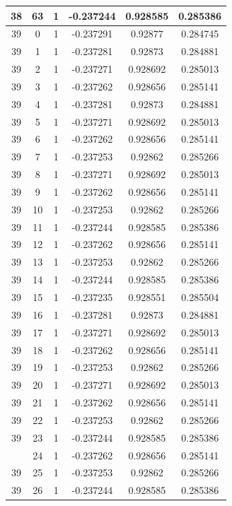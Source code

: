 \documentclass[12pt,a4paper]{article}
\numberwithin{equation}{section}
\numberwithin{figure}{section}
\numberwithin{table}{section}
\begin{document}
\begin{longtable}{|c|c|c|c|c|c|}
38 & 63 & 1 & -0.237244 & 0.928585 & 0.285386 \\ \hline
39 & 0 & 1 & -0.237291 & 0.92877 & 0.284745 \\ \hline
39 & 1 & 1 & -0.237281 & 0.92873 & 0.284881 \\ \hline
39 & 2 & 1 & -0.237271 & 0.928692 & 0.285013 \\ \hline
39 & 3 & 1 & -0.237262 & 0.928656 & 0.285141 \\ \hline
39 & 4 & 1 & -0.237281 & 0.92873 & 0.284881 \\ \hline
39 & 5 & 1 & -0.237271 & 0.928692 & 0.285013 \\ \hline
39 & 6 & 1 & -0.237262 & 0.928656 & 0.285141 \\ \hline
39 & 7 & 1 & -0.237253 & 0.92862 & 0.285266 \\ \hline
39 & 8 & 1 & -0.237271 & 0.928692 & 0.285013 \\ \hline
39 & 9 & 1 & -0.237262 & 0.928656 & 0.285141 \\ \hline
39 & 10 & 1 & -0.237253 & 0.92862 & 0.285266 \\ \hline
39 & 11 & 1 & -0.237244 & 0.928585 & 0.285386 \\ \hline
39 & 12 & 1 & -0.237262 & 0.928656 & 0.285141 \\ \hline
39 & 13 & 1 & -0.237253 & 0.92862 & 0.285266 \\ \hline
39 & 14 & 1 & -0.237244 & 0.928585 & 0.285386 \\ \hline
39 & 15 & 1 & -0.237235 & 0.928551 & 0.285504 \\ \hline
39 & 16 & 1 & -0.237281 & 0.92873 & 0.284881 \\ \hline
39 & 17 & 1 & -0.237271 & 0.928692 & 0.285013 \\ \hline
39 & 18 & 1 & -0.237262 & 0.928656 & 0.285141 \\ \hline
39 & 19 & 1 & -0.237253 & 0.92862 & 0.285266 \\ \hline
39 & 20 & 1 & -0.237271 & 0.928692 & 0.285013 \\ \hline
39 & 21 & 1 & -0.237262 & 0.928656 & 0.285141 \\ \hline
39 & 22 & 1 & -0.237253 & 0.92862 & 0.285266 \\ \hline
39 & 23 & 1 & -0.237244 & 0.928585 & 0.285386 \\ \hline
\pagebreak
39 & 24 & 1 & -0.237262 & 0.928656 & 0.285141 \\ \hline
39 & 25 & 1 & -0.237253 & 0.92862 & 0.285266 \\ \hline
39 & 26 & 1 & -0.237244 & 0.928585 & 0.285386 \\ \hline

\end{longtable}
\end{document}
